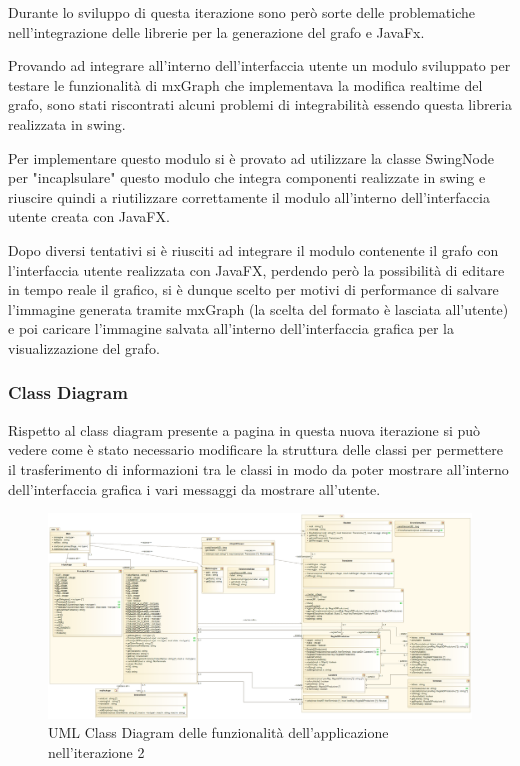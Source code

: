 \documentclass[12pt]{article}
\begin{document}
Durante lo sviluppo di questa iterazione sono però sorte delle problematiche nell'integrazione delle librerie per la generazione del grafo e JavaFx.\par
Provando ad integrare all'interno dell'interfaccia utente un modulo sviluppato per testare le funzionalità di mxGraph che implementava la modifica realtime del grafo, sono stati riscontrati alcuni problemi di integrabilità essendo questa libreria realizzata in swing.\par
Per implementare questo modulo si è provato ad utilizzare la classe SwingNode per "incaplsulare" questo modulo che integra componenti realizzate in swing e riuscire quindi a riutilizzare correttamente il modulo all'interno dell'interfaccia utente creata con JavaFX.\par
Dopo diversi tentativi si è riusciti ad integrare il modulo contenente il grafo con l'interfaccia utente realizzata con JavaFX, perdendo però la possibilità di editare in tempo reale il grafico, si è dunque scelto per motivi di performance di salvare l'immagine generata tramite mxGraph (la scelta del formato è lasciata all'utente) e poi caricare l'immagine salvata all'interno dell'interfaccia grafica per la visualizzazione del grafo.

\subsubsection{Class Diagram}
Rispetto al class diagram presente a pagina \pageref{rifUMLV1} in questa nuova iterazione si può vedere come è stato necessario modificare la struttura delle classi per permettere il trasferimento di informazioni tra le classi in modo da poter mostrare all'interno dell'interfaccia grafica i vari messaggi da mostrare all'utente.

\begin{figure}
\centering
\includegraphics[scale=0.3]{immagini/UMLV2.png}
\caption{UML Class Diagram delle funzionalità dell'applicazione nell'iterazione 2}
\end{figure}
\pagebreak
\end{document}
